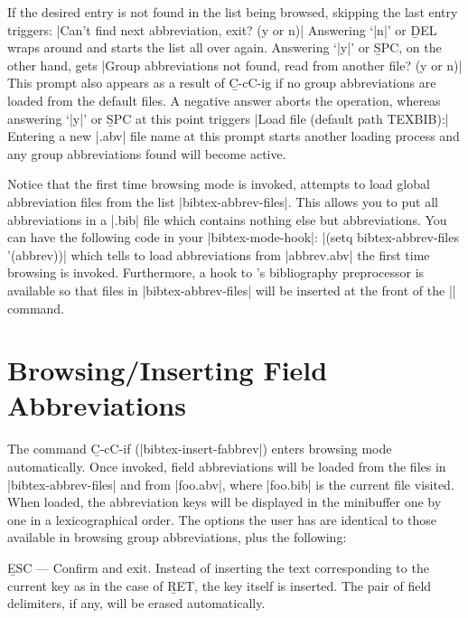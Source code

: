 \noindent
If the desired entry is not found in the list being browsed,
skipping the last entry triggers:
\begindisplay
|Can't find next abbreviation, exit? (y or n)|\cr
\enddisplay
Answering `|n|' or {\b DEL} wraps around and starts the list all over again.
Answering `|y|' or {\b SPC}, on the other hand, gets
\begindisplay
|Group abbreviations not found, read from another file? (y or n)|\cr
\enddisplay
This prompt also appears as a result of {\b C-c{\s}C-i{\s}g}
if no group abbreviations are loaded from the default files.
A negative answer aborts the operation, whereas
answering `|y|' or {\b SPC} at this point triggers
\begindisplay
|Load file (default path TEXBIB):| \block\cr
\enddisplay
Entering a new |.abv| file name at this prompt starts another loading
process and any group abbreviations found will become active.

Notice that the first time browsing mode is invoked, {\BM} attempts
to load global abbreviation files from the list |bibtex-abbrev-files|.
This allows you to put all abbreviations in a |.bib| file which contains
nothing else but abbreviations.  You can have the following code in your
|bibtex-mode-hook|:
\begindisplay
|(setq bibtex-abbrev-files '(abbrev))|\cr
\enddisplay
which tells {\BM} to load abbreviations from |abbrev.abv| the first time
browsing is invoked.  Furthermore, a hook to {\TM}'s bibliography
preprocessor is available so that files in |bibtex-abbrev-files| will
be inserted at the front of the || command.

\section{Browsing/Inserting Field Abbreviations}

\noindent
The command {\b C-c{\s}C-i{\s}f} (|bibtex-insert-fabbrev|) enters
browsing mode automatically.   Once invoked, field abbreviations
will be loaded from the files in |bibtex-abbrev-files| and from |foo.abv|,
where |foo.bib| is the current file visited.
When loaded, the abbreviation keys will be displayed in the minibuffer one by
one in a lexicographical order.
The options the user has are identical to those available
in browsing group abbreviations, plus the following:
\item{\bull}{{\b ESC} --- Confirm and exit.  Instead of inserting the text
corresponding to the current key as in the case of {\b RET}, the key
itself is inserted.  The pair of field delimiters, if any, will be erased
automatically.}

